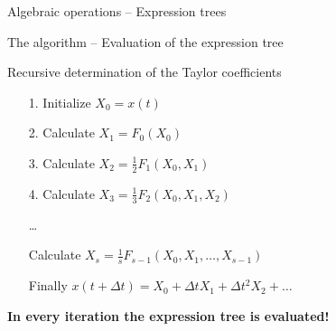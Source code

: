 \documentclass{beamer}
\begin{document}
\begin{frame}[fragile]{Algebraic operations -- Expression trees}

\end{frame}




\begin{frame}[fragile]{The algorithm -- Evaluation of the expression tree}

Recursive determination of the Taylor coefficients
\begin{itemize}
 \item[1.] Initialize $X_0 = x(t)$ 
 \item[2.] Calculate $X_1 = F_0( X_0 )$ 
 \item[3.] Calculate $X_2 = \frac{1}{2} F_1( X_0 , X_1 )$ 
 \item[4.] Calculate $X_3 = \frac{1}{3} F_2( X_0 , X_1 , X_2 )$
 \item[\dots]
 \item[ ] Calculate $X_s = \frac{1}{s} F_{s-1}( X_0 , X_1 , \dots , X_{s-1} )$
 \item[ ]
 \item[ ] Finally $x(t+\Delta t ) = X_0 + \Delta t X_1 + \Delta t^2 X_2 + \dots $
\end{itemize}

\vspace{4ex}

\pause

{\bf In every iteration the expression tree is evaluated!}


\end{frame}
\end{document}
